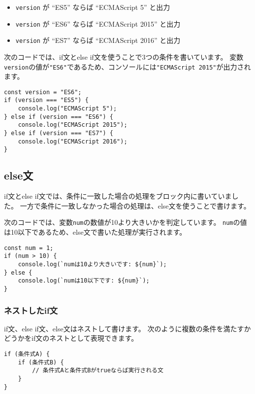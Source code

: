 \begin{itemize}
\item
  \texttt{version} が ``ES5'' ならば ``ECMAScript 5''
  と出力
\item
  \texttt{version} が ``ES6'' ならば ``ECMAScript
  2015'' と出力
\item
  \texttt{version} が ``ES7'' ならば ``ECMAScript
  2016'' と出力
\end{itemize}

次のコードでは、if文とelse if文を使うことで3つの条件を書いています。
変数\texttt{version}の値が\texttt{"ES6"}であるため、コンソールには\texttt{"ECMAScript 2015"}が出力されます。

\begin{lstlisting}
const version = "ES6";
if (version === "ES5") {
    console.log("ECMAScript 5");
} else if (version === "ES6") {
    console.log("ECMAScript 2015");
} else if (version === "ES7") {
    console.log("ECMAScript 2016");
}
\end{lstlisting}

\hypertarget{else-statement}{%
\subsection{else文}\label{else-statement}}

if文とelse
if文では、条件に一致した場合の処理をブロック内に書いていました。
一方で条件に一致しなかった場合の処理は、else文を使うことで書けます。

次のコードでは、変数\texttt{num}の数値が10より大きいかを判定しています。
\texttt{num}の値は10以下であるため、else文で書いた処理が実行されます。

\begin{lstlisting}
const num = 1;
if (num > 10) {
    console.log(`numは10より大きいです: ${num}`);
} else {
    console.log(`numは10以下です: ${num}`);
}
\end{lstlisting}

\hypertarget{nested-if-statement}{%
\subsubsection{ネストしたif文}\label{nested-if-statement}}

if文、else if文、else文はネストして書けます。
次のように複数の条件を満たすかどうかをif文のネストとして表現できます。

\begin{lstlisting}
if (条件式A) {
    if (条件式B) {
        // 条件式Aと条件式Bがtrueならば実行される文
    }
}
\end{lstlisting}

